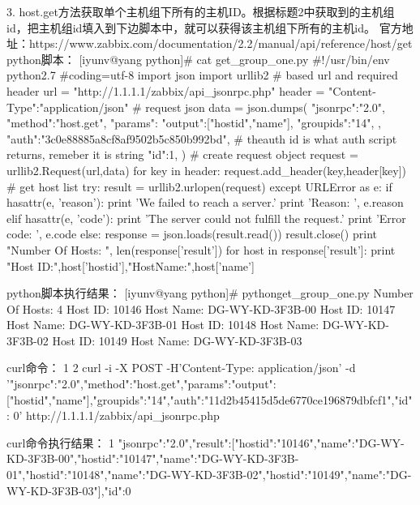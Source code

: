 3.     host.get方法获取单个主机组下所有的主机ID。根据标题2中获取到的主机组id，把主机组id填入到下边脚本中，就可以获得该主机组下所有的主机id。
官方地址：https://www.zabbix.com/documentation/2.2/manual/api/reference/host/get
python脚本：
[iyunv@yang python]# cat get_group_one.py
#!/usr/bin/env python2.7
#coding=utf-8
import json
import urllib2
# based url and required header
url = "http://1.1.1.1/zabbix/api_jsonrpc.php"
header = {"Content-Type":"application/json"}
# request json
data = json.dumps(
{
   "jsonrpc":"2.0",
   "method":"host.get",
   "params":{
       "output":["hostid","name"],
       "groupids":"14",
   },
   "auth":"3c0e88885a8cf8af9502b5c850b992bd", # theauth id is what auth script returns, remeber it is string
   "id":1,
})
# create request object
request = urllib2.Request(url,data)
for key in header:
   request.add_header(key,header[key])
# get host list
try:
   result = urllib2.urlopen(request)
except URLError as e:
   if hasattr(e, 'reason'):
       print 'We failed to reach a server.'
       print 'Reason: ', e.reason
   elif hasattr(e, 'code'):
       print 'The server could not fulfill the request.'
       print 'Error code: ', e.code
else:
   response = json.loads(result.read())
   result.close()
   print "Number Of Hosts: ", len(response['result'])
   for host in response['result']:
       print "Host ID:",host['hostid'],"HostName:",host['name']



python脚本执行结果：
[iyunv@yang python]# pythonget_group_one.py  
Number Of Hosts:  4
Host ID: 10146 Host Name: DG-WY-KD-3F3B-00
Host ID: 10147 Host Name: DG-WY-KD-3F3B-01
Host ID: 10148 Host Name: DG-WY-KD-3F3B-02
Host ID: 10149 Host Name: DG-WY-KD-3F3B-03



curl命令：
1
2
curl -i -X POST -H'Content-Type: application/json' -d '{"jsonrpc":"2.0","method":"host.get","params":{"output":["hostid","name"],"groupids":"14"},"auth":"11d2b45415d5de6770ce196879dbfcf1","id": 0}' 
http://1.1.1.1/zabbix/api_jsonrpc.php



curl命令执行结果：
1
{"jsonrpc":"2.0","result":[{"hostid":"10146","name":"DG-WY-KD-3F3B-00"},{"hostid":"10147","name":"DG-WY-KD-3F3B-01"},{"hostid":"10148","name":"DG-WY-KD-3F3B-02"},{"hostid":"10149","name":"DG-WY-KD-3F3B-03"}],"id":0}




